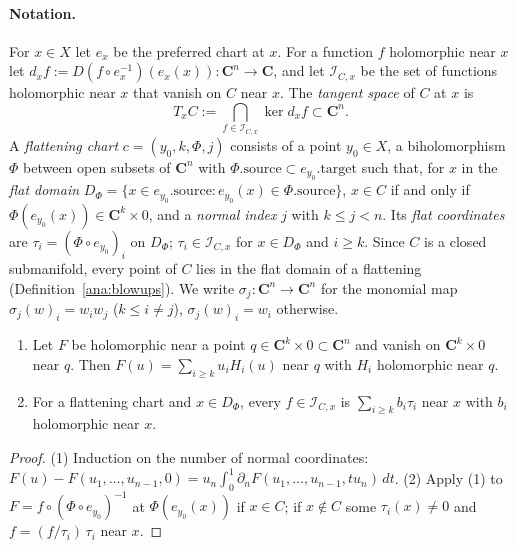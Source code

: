 \paragraph{Notation.} For \(x\in X\) let \(e_x\) be the preferred chart at \(x\). For a function \(f\) holomorphic near \(x\) let
\(d_xf:=D(f\circ e_x^{-1})(e_x(x))\colon\mathbf C^n\to\mathbf C\), and let \(\mathcal I_{C,x}\) be the set of functions holomorphic near \(x\) that
vanish on \(C\) near \(x\). The \emph{tangent space} of \(C\) at \(x\) is
\[
 T_xC:=\bigcap_{f\in\mathcal I_{C,x}}\ker d_xf\subset\mathbf C^n .
\]
A \emph{flattening chart} \(c=(y_0,k,\Phi,j)\) consists of a point \(y_0\in X\), a biholomorphism \(\Phi\) between open subsets of \(\mathbf C^n\)
with \(\Phi.\mathrm{source}\subset e_{y_0}.\mathrm{target}\) such that, for \(x\) in the \emph{flat domain}
\(D_\Phi=\{x\in e_{y_0}.\mathrm{source}:e_{y_0}(x)\in\Phi.\mathrm{source}\}\), \(x\in C\) if and only if \(\Phi(e_{y_0}(x))\in\mathbf C^k\times0\),
and a \emph{normal index} \(j\) with \(k\le j<n\). Its \emph{flat coordinates} are \(\tau_i=(\Phi\circ e_{y_0})_i\) on \(D_\Phi\);
\(\tau_i\in\mathcal I_{C,x}\) for \(x\in D_\Phi\) and \(i\ge k\). Since \(C\) is a closed submanifold, every point of \(C\) lies in the flat domain of
a flattening (Definition~\ref{ana:blowups}). We write \(\sigma_j\colon\mathbf C^n\to\mathbf C^n\) for the monomial map
\(\sigma_j(w)_i=w_iw_j\) (\(k\le i\ne j\)), \(\sigma_j(w)_i=w_i\) otherwise.

\begin{lemma}
\label{bex:hadamard}
\leanok
\begin{enumerate}
\item Let \(F\) be holomorphic near a point \(q\in\mathbf C^k\times0\subset\mathbf C^n\) and vanish on \(\mathbf C^k\times0\) near \(q\). Then
\(F(u)=\sum_{i\ge k}u_iH_i(u)\) near \(q\) with \(H_i\) holomorphic near \(q\).
\item For a flattening chart and \(x\in D_\Phi\), every \(f\in\mathcal I_{C,x}\) is \(\sum_{i\ge k}b_i\tau_i\) near \(x\) with \(b_i\) holomorphic near \(x\).
\end{enumerate}
\end{lemma}
\begin{proof}
\leanok
(1) Induction on the number of normal coordinates: \(F(u)-F(u_1,\dots,u_{n-1},0)=u_n\int_0^1\partial_nF(u_1,\dots,u_{n-1},tu_n)\,dt\).
(2) Apply (1) to \(F=f\circ(\Phi\circ e_{y_0})^{-1}\) at \(\Phi(e_{y_0}(x))\) if \(x\in C\); if \(x\notin C\) some \(\tau_i(x)\ne0\) and
\(f=(f/\tau_i)\,\tau_i\) near \(x\).
\end{proof}

